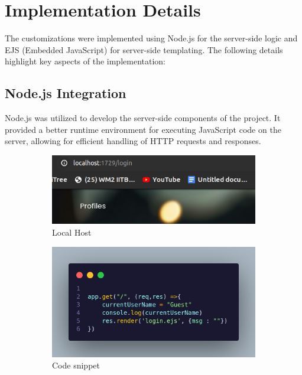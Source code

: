 \documentclass{article}
\begin{document}
\section{Implementation Details}
The customizations were implemented using Node.js for the server-side logic and EJS (Embedded JavaScript) for server-side templating. The following details highlight key aspects of the implementation:


    \subsection{\textbf{Node.js Integration}}  Node.js was utilized to develop the server-side components of the project. It provided a better runtime environment for executing JavaScript code on the server, allowing for efficient handling of HTTP requests and responses.
  \begin{figure}[htbp] 
    \centering 
    \begin{subfigure}[b]{0.45\textwidth} 
        \centering 
        \includegraphics[width=\textwidth]{hosting.png}
        \caption{Local Host} 
        \label{host} 
    \end{subfigure}
    \hfill %
    \begin{subfigure}[b]{0.45\textwidth} 
        \centering %
        \includegraphics[width=\textwidth]{codenode.png} 
        \caption{Code snippet} %
        \label{node} %
    \end{subfigure}
    \caption{} %
    \label{NodeJs} %
\end{figure}
\end{document}
